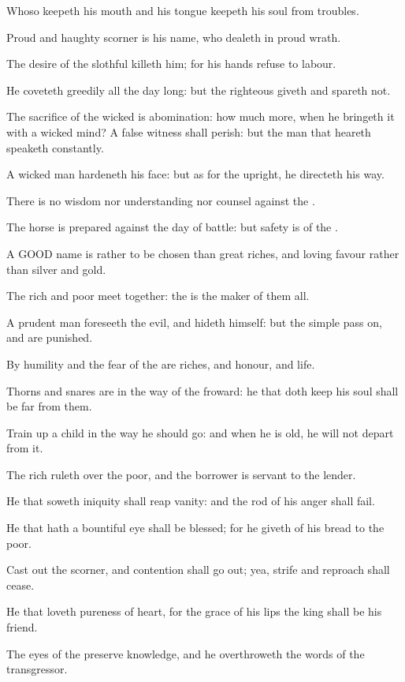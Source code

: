 \Verse Whoso keepeth his mouth and his tongue keepeth his soul from troubles.

\Verse Proud and haughty scorner is his name, who dealeth in proud wrath.

\Verse The desire of the slothful killeth him; for his hands refuse to labour.

\Verse He coveteth greedily all the day long: but the righteous giveth and spareth not.

\Verse The sacrifice of the wicked is abomination: how much more, when he bringeth it with a wicked mind?  \Verse A false witness shall perish: but the man that heareth speaketh constantly.

\Verse A wicked man hardeneth his face: but as for the upright, he directeth his way.

\Verse There is no wisdom nor understanding nor counsel against the \LORD.

\Verse The horse is prepared against the day of battle: but safety is of the \LORD.


\Chapter
\Verse A GOOD name is rather to be chosen than great riches, and loving favour rather than silver and gold.

\Verse The rich and poor meet together: the \LORD is the maker of them all.

\Verse A prudent man foreseeth the evil, and hideth himself: but the simple pass on, and are punished.

\Verse By humility and the fear of the \LORD are riches, and honour, and life.

\Verse Thorns and snares are in the way of the froward: he that doth keep his soul shall be far from them.

\Verse Train up a child in the way he should go: and when he is old, he will not depart from it.

\Verse The rich ruleth over the poor, and the borrower is servant to the lender.

\Verse He that soweth iniquity shall reap vanity: and the rod of his anger shall fail.

\Verse He that hath a bountiful eye shall be blessed; for he giveth of his bread to the poor.

\Verse Cast out the scorner, and contention shall go out; yea, strife and reproach shall cease.

\Verse He that loveth pureness of heart, for the grace of his lips the king shall be his friend.

\Verse The eyes of the \LORD preserve knowledge, and he overthroweth the words of the transgressor.

